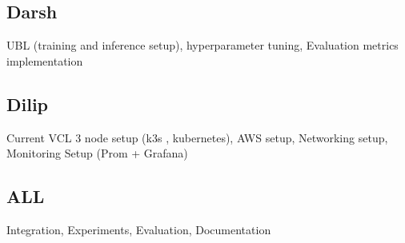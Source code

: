 \documentclass[sigconf]{acmart}
\begin{document}
\subsection{Darsh}
UBL (training and inference setup), hyperparameter tuning, Evaluation metrics implementation


\subsection{Dilip}
Current  VCL 3 node setup (k3s , kubernetes), AWS setup, Networking setup, Monitoring Setup (Prom + Grafana)

\subsection{ALL}
Integration, Experiments, Evaluation, Documentation








\end{document}
